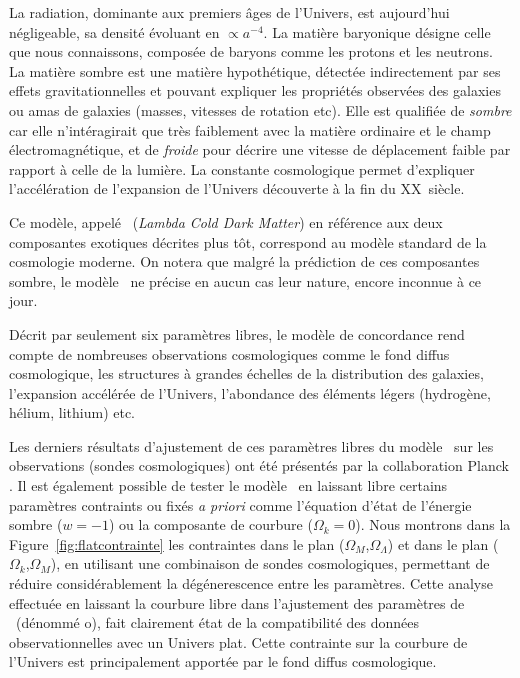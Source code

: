 \documentclass[../main/main.tex]{subfiles}
\begin{document}
La radiation, dominante aux premiers âges de l'Univers, est aujourd'hui
négligeable, sa densité évoluant en $\propto a^{-4}$. La matière baryonique désigne celle que nous
connaissons, composée de baryons comme les protons et les neutrons. La
matière sombre est une matière hypothétique, détectée indirectement par
ses effets gravitationnelles et pouvant expliquer les propriétés
observées des galaxies ou amas de galaxies (masses, vitesses de
rotation etc). Elle est qualifiée de \textit{sombre} car elle n'intéragirait que
très faiblement avec la matière ordinaire et le champ
électromagnétique, et de \textit{froide} pour décrire une vitesse de
déplacement faible par rapport à celle de la lumière. La constante
cosmologique permet d'expliquer l'accélération de l'expansion de
l'Univers découverte à la fin du XX\ieme\ siècle.

Ce modèle, appelé \lcdm\ (\textit{Lambda Cold Dark Matter}) en
référence aux deux composantes exotiques décrites plus tôt,
correspond au modèle standard de la cosmologie moderne. On notera que
malgré la prédiction de ces composantes sombre, le modèle \lcdm\ ne
précise en aucun cas leur nature, encore inconnue à ce jour.

Décrit par seulement six paramètres libres, le modèle de concordance
rend compte de nombreuses observations cosmologiques comme le fond
diffus cosmologique, les structures à grandes échelles de la
distribution des galaxies, l'expansion accélérée de l'Univers,
l'abondance des éléments légers (hydrogène, hélium, lithium) etc.

Les derniers résultats d'ajustement de ces paramètres libres du modèle \lcdm\ sur les
observations (sondes cosmologiques) ont été présentés
par la collaboration Planck \citep{Planckparams2018}. Il est également
possible de tester le modèle \lcdm\ en laissant libre certains
paramètres contraints ou fixés \textit{a priori} comme l'équation d'état
de l'énergie sombre ($w=-1$) ou la composante de courbure
($\Omega_{k}=0$).
Nous montrons dans la Figure~\ref{fig:flatcontrainte} les contraintes dans le plan
($\Omega_{M}$,$\Omega_{\Lambda}$) et dans le plan ($\Omega_{k}$,$\Omega_{M}$), en utilisant une combinaison de
sondes cosmologiques, permettant de réduire considérablement la
dégénerescence entre les paramètres. Cette analyse effectuée en laissant
la courbure libre dans l'ajustement des paramètres de \lcdm\ (dénommé o\lcdm), fait clairement état
de la compatibilité des données observationnelles avec un Univers
plat. Cette contrainte sur la courbure de l'Univers est principalement
apportée par le fond diffus cosmologique. 
\end{document}
